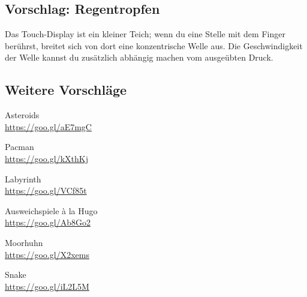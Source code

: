 \subsection*{Vorschlag: Regentropfen}

Das Touch-Display ist ein kleiner Teich;
wenn du eine Stelle mit dem Finger berührst, breitet sich von dort eine konzentrische Welle aus.
Die Geschwindigkeit der Welle kannst du zusätzlich abhängig machen vom ausgeübten Druck.


\subsection*{Weitere Vorschläge}
\begin{minipage}{.45\textwidth}
    \begin{center}Asteroids\\
        \href{https://goo.gl/aE7mgC}{https://goo.gl/aE7mgC}
    \end{center}
    \vspace{2ex}
    \begin{center}Pacman\\
        \href{https://goo.gl/kXthKj}{https://goo.gl/kXthKj}
    \end{center}
    \vspace{2ex}
    \begin{center}Labyrinth\\
        \href{https://goo.gl/VCf85t}{https://goo.gl/VCf85t}
    \end{center}
\end{minipage}
\begin{minipage}{.45\textwidth}
	\begin{center}Ausweichspiele à la Hugo\\
        \href{https://goo.gl/Ab8Go2}{https://goo.gl/Ab8Go2}
    \end{center}
    \vspace{2ex}
	\begin{center}Moorhuhn\\
        \href{https://goo.gl/X2xems}{https://goo.gl/X2xems}
    \end{center}
    \vspace{2ex}
	\begin{center}Snake\\
       \href{https://goo.gl/iL2L5M}{https://goo.gl/iL2L5M}
    \end{center}
\end{minipage}
